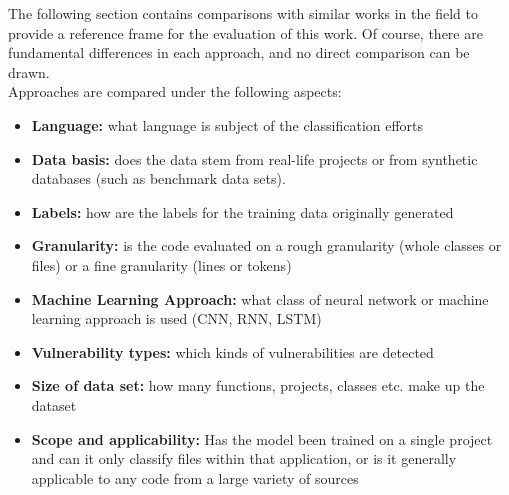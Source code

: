 \documentclass[
a4paper,
pagesize,
pdftex,
12pt,
ngerman,
fleqn,
final,
]{scrartcl}
\begin{document}
	The following section contains comparisons with similar works in the field to provide a reference frame for the evaluation of this work. Of course, there are fundamental differences in each approach, and no direct comparison can be drawn.\\
	Approaches are compared under the following aspects:\\
	\begin{itemize}
		\item \textbf{Language:} what language is subject of the classification efforts
		\item \textbf{Data basis:} does the data stem from real-life projects or from synthetic databases (such as benchmark data sets).
		\item \textbf{Labels:} how are the labels for the training data originally generated
		\item \textbf{Granularity:} is the code evaluated on a rough granularity (whole classes or files) or a fine granularity (lines or tokens)
		\item \textbf{Machine Learning Approach:} what class of neural network or machine learning approach is used (CNN, RNN, LSTM)
		\item \textbf{Vulnerability types:} which kinds of vulnerabilities are detected
		\item \textbf{Size of data set:} how many functions, projects, classes etc. make up the dataset
		\item \textbf{Scope and applicability:} Has the model been trained on a single project and can it only classify files within that application, or is it generally applicable to any code from a large variety of sources
	\end{itemize}
	
\end{document}
